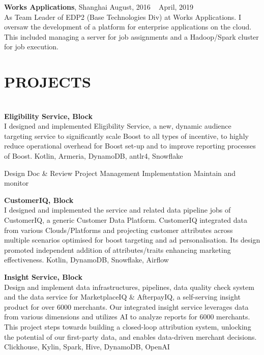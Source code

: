 \documentclass{res}
\begin{document}
\begin{resume}
\vspace{-15pt}
{\bf Works Applications}, Shanghai \hfill August, 2016 ~ April, 2019\\
As Team Leader of EDP2 (Base Technologies Div) at Works Applications.
I oversaw the development of a platform for enterprise applications on the cloud.
This included managing a server for job assignments and a Hadoop/Spark cluster for job execution.

\vspace{-12pt}
\section{{PROJECTS}}\label{sec:projects}
\vspace{-10pt}
\hrulefill\\
{\bf Eligibility Service, Block} \\
I designed and implemented Eligibility Service, a new, dynamic audience targeting service
to significantly scale Boost to all types of incentive, 
to highly reduce operational overhead for Boost set-up
and to improve reporting processes of Boost.
Kotlin, Armeria, DynamoDB, antlr4, Snowflake

Design Doc & Review
Project Management
Implementation
Maintain and monitor

\vspace{-10pt}
{\bf CustomerIQ, Block} \\
I designed and implemented the service and related data pipeline jobs of CustomerIQ, a generic Customer Data Platform.
CustomerIQ integrated data from various Clouds/Platforms and projecting  customer attributes across multiple scenarios optimised for boost targeting and ad personalisation.
Its design promoted independent addition of attributes/traits enhancing marketing effectiveness.
Kotlin, DynamoDB, Snowflake, Airflow

\vspace{-10pt}
{\bf Insight Service, Block}\\
Design and implement data infrastructures, pipelines, data quality check system and the data service for MarketplaceIQ \& AfterpayIQ,
a self-serving insight product for over 6000 merchants.
Our integrated insight service leverages data from various dimensions and utilizes AI to analyze reports for 6000 merchants.
This project steps towards building a closed-loop attribution system, unlocking the potential of our first-party data, and enables data-driven merchant decisions.
Clickhouse, Kylin, Spark, Hive, DynamoDB, OpenAI


\end{resume}
\end{document}
